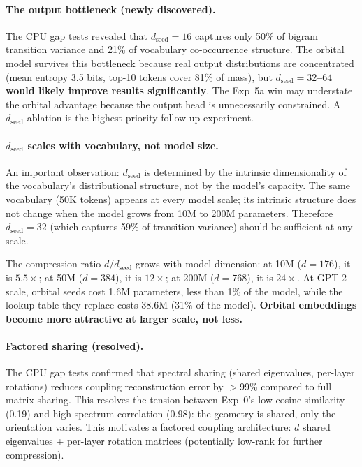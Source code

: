 \documentclass[11pt, a4paper]{article}
\theoremstyle{remark}
\begin{document}
\paragraph{The output bottleneck (newly discovered).}
The CPU gap tests revealed that $d_{\text{seed}} = 16$ captures only 50\% of bigram transition variance and 21\% of vocabulary co-occurrence structure.
The orbital model survives this bottleneck because real output distributions are concentrated (mean entropy 3.5 bits, top-10 tokens cover 81\% of mass), but \textbf{$d_{\text{seed}} = 32$--$64$ would likely improve results significantly}.
The Exp~5a win may understate the orbital advantage because the output head is unnecessarily constrained.
A $d_{\text{seed}}$ ablation is the highest-priority follow-up experiment.

\paragraph{$d_{\text{seed}}$ scales with vocabulary, not model size.}
An important observation: $d_{\text{seed}}$ is determined by the intrinsic dimensionality of the vocabulary's distributional structure, not by the model's capacity.
The same vocabulary (50K tokens) appears at every model scale; its intrinsic structure does not change when the model grows from 10M to 200M parameters.
Therefore $d_{\text{seed}} = 32$ (which captures 59\% of transition variance) should be sufficient at any scale.

The compression ratio $d / d_{\text{seed}}$ grows with model dimension:
at 10M ($d = 176$), it is $5.5\times$;
at 50M ($d = 384$), it is $12\times$;
at 200M ($d = 768$), it is $24\times$.
At GPT-2 scale, orbital seeds cost 1.6M parameters, less than 1\% of the model, while the lookup table they replace costs 38.6M (31\% of the model).
\textbf{Orbital embeddings become more attractive at larger scale, not less.}

\paragraph{Factored sharing (resolved).}
The CPU gap tests confirmed that spectral sharing (shared eigenvalues, per-layer rotations) reduces coupling reconstruction error by $>$99\% compared to full matrix sharing.
This resolves the tension between Exp~0's low cosine similarity (0.19) and high spectrum correlation (0.98): the geometry is shared, only the orientation varies.
This motivates a factored coupling architecture: $d$ shared eigenvalues + per-layer rotation matrices (potentially low-rank for further compression).
\end{document}
